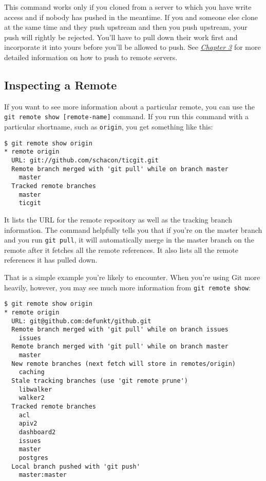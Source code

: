 \documentclass[a4paper]{book}
\newcommand{\prechap}{Chapter }
\newcommand{\postchap}{}
\newcommand{\chapref}[1]{\hyperref[chap:#1]{\prechap #1\postchap}}
\begin{document}
This command works only if you cloned from a server to which you have write access and if nobody has pushed in the meantime. If you and someone else clone at the same time and they push upstream and then you push upstream, your push will rightly be rejected. You'll have to pull down their work first and incorporate it into yours before you'll be allowed to push. See \emph{\chapref{3}} for more detailed information on how to push to remote servers.

\subsection{Inspecting a Remote}\label{inspecting-a-remote}

If you want to see more information about a particular remote, you can use the \texttt{git remote show {[}remote-name{]}} command. If you run this command with a particular shortname, such as \texttt{origin}, you get something like this:

\begin{shaded}\begin{verbatim}
$ git remote show origin
* remote origin
  URL: git://github.com/schacon/ticgit.git
  Remote branch merged with 'git pull' while on branch master
    master
  Tracked remote branches
    master
    ticgit
\end{verbatim}\end{shaded}

It lists the URL for the remote repository as well as the tracking branch information. The command helpfully tells you that if you're on the master branch and you run \texttt{git pull}, it will automatically merge in the master branch on the remote after it fetches all the remote references. It also lists all the remote references it has pulled down.

That is a simple example you're likely to encounter. When you're using Git more heavily, however, you may see much more information from \texttt{git remote show}:

\begin{shaded}\begin{verbatim}
$ git remote show origin
* remote origin
  URL: git@github.com:defunkt/github.git
  Remote branch merged with 'git pull' while on branch issues
    issues
  Remote branch merged with 'git pull' while on branch master
    master
  New remote branches (next fetch will store in remotes/origin)
    caching
  Stale tracking branches (use 'git remote prune')
    libwalker
    walker2
  Tracked remote branches
    acl
    apiv2
    dashboard2
    issues
    master
    postgres
  Local branch pushed with 'git push'
    master:master
\end{verbatim}\end{shaded}
\end{document}
